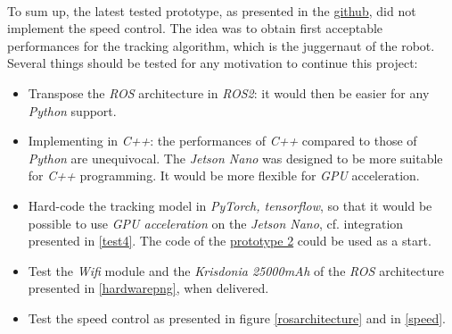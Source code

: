 \\\indent To sum up, the latest tested prototype, as presented in the \href{https://github.com/klipfel/tracker-v1}{github},
did not implement the speed control. The idea was to obtain first acceptable performances
for the tracking algorithm, which is the juggernaut of the robot. Several 
things should be tested for any motivation to continue this project:
\begin{itemize}
	\item[\textbullet] Transpose the \textit{ROS} architecture in \textit{ROS2}: it would then 
	be easier for any \textit{Python} support.
	\item[\textbullet] Implementing in \textit{C++}: the performances of
	\textit{C++} compared to those of \textit{Python} are unequivocal. The \textit{Jetson Nano}
	was designed to be more suitable for \textit{C++} programming. It would be more
	flexible for \textit{GPU} acceleration.
	\item[\textbullet] Hard-code the tracking model in \textit{PyTorch, tensorflow}, so that 
	it would be possible to use \textit{GPU acceleration} on the \textit{Jetson Nano}, cf. 
	integration presented in \vref{test4}. The code of the \href{https://github.com/klipfel/tracker-v2}{prototype 2}
	could be used as a start.
	\item[\textbullet] Test the \textit{Wifi} module and the \textit{Krisdonia 25000mAh}
	of the \textit{ROS} architecture 
	presented in \vref{hardwarepng}, when delivered.
	\item[\textbullet] Test the speed control as presented in figure \vref{rosarchitecture} and in \vref{speed}.
\end{itemize}